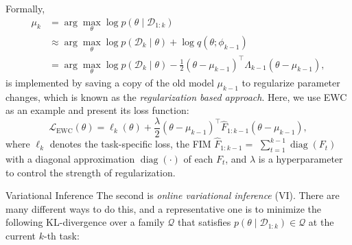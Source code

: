 \documentclass[9pt,dvipsnames]{beamer}
\begin{document}
\begin{frame}
    Formally,
    $$
        \begin{aligned}
            \mu_{k} & =\arg \max _{\theta} \log p\left(\theta \mid \mathcal{D}_{1: k}\right)                                                                                          \\
                    & \approx \arg \max _{\theta} \log p\left(\mathcal{D}_{k} \mid \theta\right)+\log q\left(\theta ; \phi_{k-1}\right)                                               \\
                    & =\arg \max _{\theta} \log p\left(\mathcal{D}_{k} \mid \theta\right)-\frac{1}{2}\left(\theta-\mu_{k-1}\right)^{\top} \Lambda_{k-1}\left(\theta-\mu_{k-1}\right),
        \end{aligned}
    $$
    is implemented by saving a copy of the old model $\mu_{k-1}$ to regularize parameter changes, which is known as the \textit{regularization based approach}. Here, we use EWC as an example and present its loss function:
    $$
        \mathcal{L}_{\mathrm{EWC}}(\theta)=\ell_{k}(\theta)+\frac{\lambda}{2}\left(\theta-\mu_{k-1}\right)^{\top} \hat{F}_{1: k-1}\left(\theta-\mu_{k-1}\right),
    $$
    where $\ell_{k}$ denotes the task-specific loss, the FIM $\hat{F}_{1: k-1}=$ $\sum_{t=1}^{k-1} \operatorname{diag}\left(F_{t}\right)$ with a diagonal approximation $\operatorname{diag}(\cdot)$ of each $F_{t}$, and $\lambda$ is a hyperparameter to control the strength of regularization.
\end{frame}

\begin{frame}{Variational Inference}
    The second is \textit{online variational inference} (VI). There are many different ways to do this, and a representative one is to minimize the following KL-divergence over a family $\mathcal{Q}$ that satisfies $p\left(\theta \mid \mathcal{D}_{1: k}\right) \in \mathcal{Q}$ at the current $k$-th task:
\end{frame}
\end{document}

